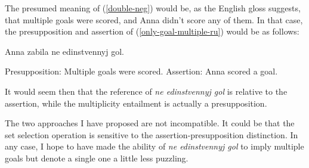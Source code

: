 \begin{exe}
\end{exe}

The presumed meaning of (\ref{double-neg}) would be, as the English gloss suggests, that multiple goals were scored, and Anna didn't score any of them. In that case, the presupposition and assertion of (\ref{only-goal-multiple-ru}) would be as follows:

\begin{exe}
	\ex Anna zabila ne edinstvennyj gol. \begin{xlist}
		\ex Presupposition: Multiple goals were scored.
		\ex Assertion: Anna scored a goal.
	\end{xlist}
\end{exe}

It would seem then that the reference of \textit{ne edinstvennyj gol} is relative to the assertion, while the multiplicity entailment is actually a presupposition.

The two approaches I have proposed are not incompatible. It could be that the set selection operation is sensitive to the assertion-presupposition distinction. In any case, I hope to have made the ability of \textit{ne edinstvennyj gol} to imply multiple goals but denote a single one a little less puzzling.